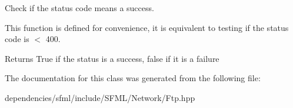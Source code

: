 Check if the status code means a success. 

This function is defined for convenience, it is equivalent to testing if the status code is $<$ 400.

\begin{DoxyReturn}{Returns}
True if the status is a success, false if it is a failure 
\end{DoxyReturn}


The documentation for this class was generated from the following file\+:\begin{DoxyCompactItemize}
\item 
dependencies/sfml/include/\+S\+F\+M\+L/\+Network/Ftp.\+hpp\end{DoxyCompactItemize}
